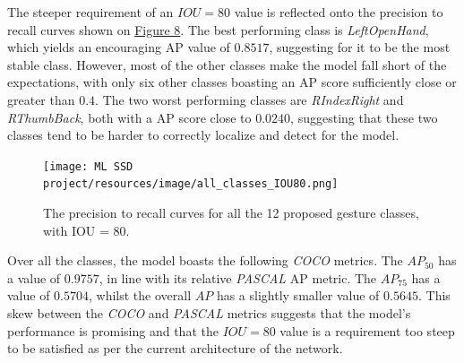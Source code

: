 \documentclass[10pt,twocolumn,letterpaper]{article}
\begin{document}
\begin{flushleft}
The steeper requirement of an $IOU=80$ value is reflected onto the precision to recall curves shown on \hyperref[figure8]{Figure 8}. The best performing class is \textit{LeftOpenHand}, which yields an encouraging AP value of $0.8517$, suggesting for it to be the most stable class. However, most of the other classes make the model fall short of the expectations, with only six other classes boasting an AP score sufficiently close or greater than $0.4$. The two worst performing classes are \textit{RIndexRight} and \textit{RThumbBack}, both with a AP score close to $0.0240$, suggesting that these two classes tend to be harder to correctly localize and detect for the model.

\begin{figure}[!h]
    \centering
    \texttt{[image: ML SSD project/resources/image/all\_classes\_IOU80.png]}
    \caption{The precision to recall curves for all the 12 proposed gesture classes, with IOU = 80.}
\end{figure}
\label{figure8}

Over all the classes, the model boasts the following \textit{COCO} metrics. The $AP_{50}$ has a value of $0.9757$, in line with its relative \textit{PASCAL} AP metric. The $AP_{75}$ has a value of $0.5704$, whilst the overall $AP$ has a slightly smaller value of $0.5645$. This skew between the \textit{COCO} and \textit{PASCAL} metrics suggests that the model's performance is promising and that the $IOU=80$ value is a requirement too steep to be satisfied as per the current architecture of the network.

\end{flushleft}
\end{document}
